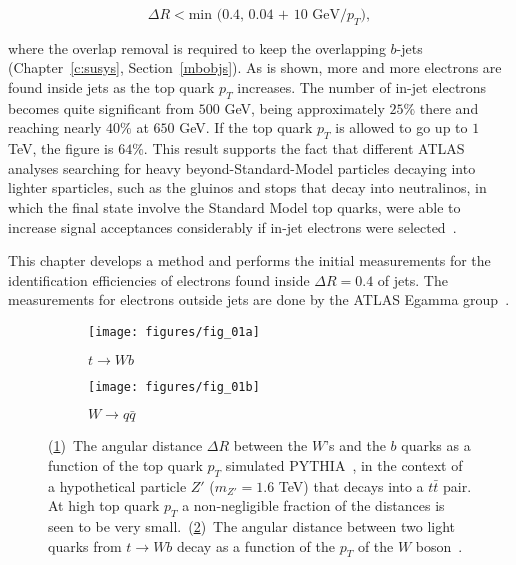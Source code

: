 \begin{equation}\label{c7overlapr}
	\Delta R <  \text{min (0.4, 0.04 + 10 GeV} / p_T),
\end{equation}

where the overlap removal is required to keep the overlapping $b$-jets
(Chapter~\ref{c:susys}, Section~\ref{mbobjs}). As is shown, more and more
electrons are found inside jets as the top quark $p_T$ increases. The number of
in-jet electrons becomes quite significant from $500$ GeV, being approximately
$25\%$ there and reaching nearly $40\%$ at $650$ GeV. If the top quark $p_T$ is
allowed to go up to $1$ TeV, the figure is $64\%$. This result supports the
fact that different ATLAS analyses searching for heavy beyond-Standard-Model
particles decaying into lighter sparticles, such as the gluinos and stops that
decay into neutralinos, in which the final state involve the Standard Model top
quarks, were able to increase signal acceptances considerably if in-jet
electrons were selected~\cite{multib-c7, stop-c7}.

This chapter develops a method and performs the initial measurements for the
identification efficiencies of electrons found inside $\Delta R=0.4$ of jets.
The measurements for electrons outside jets are done by the ATLAS Egamma
group~\cite{atlaselcid, eleffme}.

\begin{figure}[H]

	\begin{subfigure}{0.5\textwidth}
		\texttt{[image: figures/fig\_01a]}
		\caption{$t\to Wb$}
		\label{drwbtoppta}
	\end{subfigure}
	\begin{subfigure}{0.5\textwidth}
		\texttt{[image: figures/fig\_01b]}
		\caption{$W\to q\bar{q}$}
		\label{drwbtopptb}
	\end{subfigure}

	\centering
	\caption{(\ref{drwbtoppta})~The angular distance $\Delta R$ between
		the $W$'s and the $b$ quarks as a function of the top quark $p_T$ simulated
		PYTHIA~\cite{sjostrand:ch7}, in the context of a hypothetical particle $Z'$
		($m_{Z'}=1.6$ TeV) that decays into a $t\bar{t}$ pair. At high top quark $p_T$
		a non-negligible fraction of the distances is seen to be very
		small.~(\ref{drwbtopptb})~The angular distance between two light quarks from
		$t\to Wb$ decay as a function of the $p_T$ of the $W$ boson~\cite{bdis-figs}.}
	\label{f:drwbtoppt}
\end{figure}


